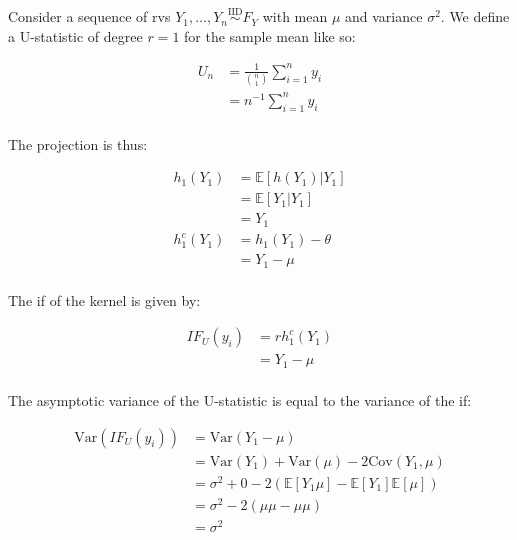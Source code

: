 \documentclass{report}
\begin{document}
Consider a sequence of \glspl{rv} $Y_1, \dots, Y_n \overset{\text{IID}}{\sim} F_Y$ with mean $\mu$ and variance $\sigma^2$. We define a U-statistic of degree $r = 1$ for the sample mean like so:

\begin{equation}\label{eq:ex-lst-u-statistic-mean}
    \begin{aligned}
      U_n 
        &= \frac{1}{\binom{n}{1}} \sum_{i=1}^n y_i \\
        &= n^{-1} \sum_{i=1}^n y_i \\
    \end{aligned}
\end{equation}

The projection is thus:

\begin{equation}\label{eq:ex-lst-u-statistic-mean-projection}
    \begin{aligned}
      h_1(Y_1)
        &= \mathbb{E}[h(Y_1) | Y_1] \\
        &= \mathbb{E}[Y_1 | Y_1] \\
        &= Y_1 \\
      h_1^c(Y_1)
        &= h_1(Y_1) - \theta \\
        &= Y_1 - \mu \\
    \end{aligned}
\end{equation}

The \gls{if} of the kernel is given by:

\begin{equation}\label{eq:ex-lst-u-statistic-mean-if}
    \begin{aligned}
      IF_U(y_i)
        &= rh_1^c(Y_1) \\
        &= Y_1 - \mu \\
    \end{aligned}
\end{equation}

The asymptotic variance of the U-statistic is equal to the variance of the \gls{if}:

\begin{equation}\label{eq:ex-lst-u-statistic-mean-if-variance}
    \begin{aligned}
      \text{Var}(IF_U(y_i))
        &= \text{Var}(Y_1 - \mu) \\
        &= \text{Var}(Y_1) + \text{Var}(\mu) - 2\text{Cov}(Y_1, \mu) \\
        &= \sigma^2 + 0 - 2(\mathbb{E}[Y_1\mu] - \mathbb{E}[Y_1]\mathbb{E}[\mu]) \\
        &= \sigma^2 - 2(\mu\mu - \mu\mu) \\
        &= \sigma^2 \\
    \end{aligned}
\end{equation}
\end{document}
